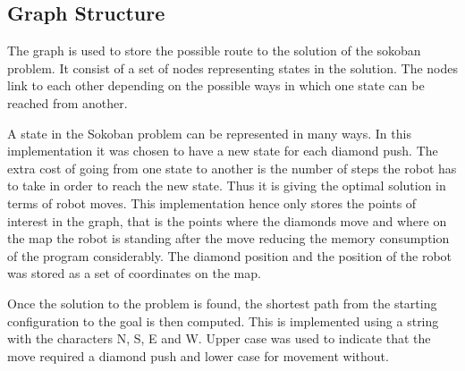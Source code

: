 
\subsection{Graph Structure}
The graph is used to store the possible route to the solution of the sokoban problem.
It consist of a set of nodes representing states in the solution.
The nodes link to each other depending on the possible ways in which one state can be reached from another.

A state in the Sokoban problem can be represented in many ways.
In this implementation it was chosen to have a new state for each diamond push.
The extra cost of going from one state to another is the number of steps the robot has to take in order to reach the new state.
Thus it is giving the optimal solution in terms of robot moves.
This implementation hence only stores the points of interest in the graph, that is the points where the diamonds move and where on the map the robot is standing after the move reducing the memory consumption of the program considerably.
The diamond position and the position of the robot was stored as a set of coordinates on the map.

Once the solution to the problem is found, the shortest path from the starting configuration to the goal is then computed.
This is implemented using a string with the characters N, S, E and W.
Upper case was used to indicate that the move required a diamond push and lower case for movement without.




